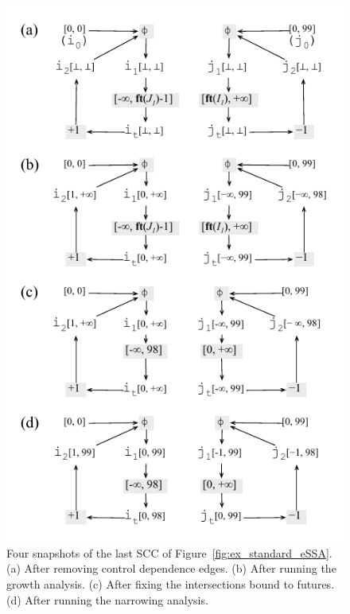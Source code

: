 \documentclass[preprint]{elsarticle}
\begin{document}
\begin{figure}[t!]
\begin{center}
\includegraphics[width=\textwidth]{images/ex_partition_grow_crop}
\end{center}
\caption{\label{fig:ex_partition_grow_crop}
Four snapshots of the last SCC of Figure~\ref{fig:ex_standard_eSSA}.
(a) After removing control dependence edges.
(b) After running the growth analysis.
(c) After fixing the intersections bound to futures.
(d) After running the narrowing analysis.}
\end{figure}
\end{document}
